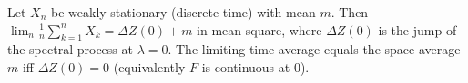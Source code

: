 Let $X_n$ be weakly stationary (discrete time) with mean $m$. Then $\lim_n \frac{1}{n} \sum_{k=1}^n X_k = \Delta Z(0) + m$ in mean square, where $\Delta Z(0)$ is the jump of the spectral process at $\lambda = 0$. The limiting time average equals the space average $m$ iff $\Delta Z(0) = 0$ (equivalently $F$ is continuous at $0$).
